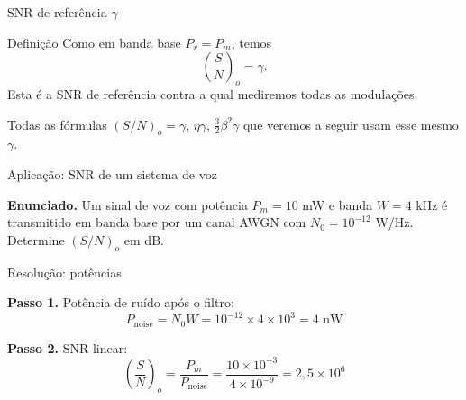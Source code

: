 
\begin{frame}{SNR de referência $\gamma$}

\begin{block}{Definição}
Como em banda base $P_r = P_m$, temos
\[
\left(\frac{S}{N}\right)_o = \gamma.
\]
Esta é a SNR de referência contra a qual mediremos todas as modulações.
\end{block}

\vspace{0.3cm}

Todas as fórmulas $(S/N)_o = \gamma$, $\eta\gamma$, $\tfrac{3}{2}\beta^2 \gamma$ que veremos a seguir usam esse mesmo $\gamma$.

\end{frame}


\begin{frame}{Aplicação: SNR de um sistema de voz}

\textbf{Enunciado.} Um sinal de voz com potência $P_m = 10$ mW e banda $W = 4$ kHz é transmitido em banda base por um canal AWGN com $N_0 = 10^{-12}$ W/Hz. Determine $(S/N)_o$ em dB.

\begin{center}
\end{center}

\end{frame}


\begin{frame}{Resolução: potências}

\textbf{Passo 1.} Potência de ruído após o filtro:
\[
P_{\text{noise}} = N_0 W = 10^{-12} \times 4 \times 10^{3} = 4 \text{ nW}
\]

\textbf{Passo 2.} SNR linear:
\[
\left(\frac{S}{N}\right)_o = \frac{P_m}{P_{\text{noise}}} = \frac{10 \times 10^{-3}}{4 \times 10^{-9}} = 2{,}5 \times 10^{6}
\]

\end{frame}

